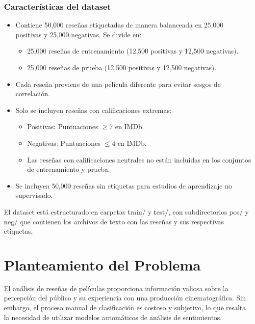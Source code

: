 \documentclass[conference]{IEEEtran}
\begin{document}
\subsubsection{Características del dataset}

\begin{itemize}

	\item Contiene 50,000 reseñas etiquetadas de manera balanceada en 25,000 positivas y 25,000 negativas. Se divide en:
		\begin{itemize}
		\item 25,000 reseñas de entrenamiento (12,500 positivas y 12,500 negativas).
		\item 25,000 reseñas de prueba (12,500 positivas y 12,500 negativas).
		\end{itemize}
	
	\item Cada reseña proviene de una película diferente para evitar sesgos de correlación.
	
	\item Solo se incluyen reseñas con calificaciones extremas:
		\begin{itemize}
		\item Positivas: Puntuaciones $ \geq 7 $ en IMDb.
		\item Negativas: Puntuaciones $ \leq 4 $ en IMDb.
		\item Las reseñas con calificaciones neutrales no están incluidas en los conjuntos de entrenamiento y prueba.
		\end{itemize}
	
	\item Se incluyen 50,000 reseñas sin etiquetas para estudios de aprendizaje no supervisado.
	
\end{itemize}

El dataset está estructurado en carpetas train/ y test/, con subdirectorios pos/ y neg/ que contienen los archivos de texto con las reseñas y sus respectivas etiquetas.


\section{Planteamiento del Problema}

El análisis de reseñas de películas proporciona información valiosa sobre la percepción del público y su experiencia con una producción cinematográfica. Sin embargo, el proceso manual de clasificación es costoso y subjetivo, lo que resalta la necesidad de utilizar modelos automáticos de análisis de sentimientos.
\end{document}
